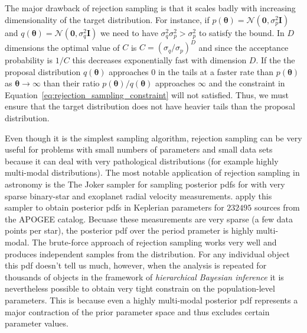 \documentclass[12pt,dvipsnames]{report}
\renewcommand{\vec}[1]{\boldsymbol{\mathbf{#1}}}
\begin{document}
The major drawback of rejection sampling is that it scales badly with
increasing dimensionality of the target distribution. For instance, if
$p(\vec{\theta})=\mathcal{N}(\vec{0}, \sigma_p^2\vec{I})$ and
$q(\vec{\theta})=\mathcal{N}(\vec{0}, \sigma_q^2\vec{I})$ we need to have
$\sigma_q^2\sigma_p^2>\sigma_p^2$ to satisfy the bound. In $D$ dimensions the
optimal value of $C$ is $C=(\sigma_q/\sigma_p)^D$ and since the acceptance
probability is $1/C$ this decreases exponentially fast with dimension $D$. If
the the proposal distribution $q(\vec{\theta})$ approaches $0$ in the tails at
a faster rate than $p(\vec{\theta})$ as $\vec{\theta}\rightarrow \infty$ than
their ratio $p(\vec{\theta})/q(\vec{\theta})$ approaches $\infty$ and the
constraint in Equation~\ref{eq:rejection_sampling_constraint} will not
satisfied. Thus, we must ensure that the target distribution does not have
heavier tails than the proposal distribution.

Even though it is the simplest sampling algorithm, rejection sampling can be
very useful for problems with small numbers of parameters and small data sets
because it can deal with very pathological distributions (for example highly
multi-modal distributions). The most notable application of rejection sampling
in astronomy is the \textsf{The Joker} sampler \citep{2017ApJ...837...20P} for
sampling posterior pdfs for with very sparse binary-star and exoplanet radial
velocity measurements. \citet{2020ApJ...895....2P} apply this sampler to obtain
posterior pdfs in Keplerian parameters for $232 495$ sources from the APOGEE
catalog. Becuase these measurements are very sparse (a few data points per
star), the posterior pdf over the period prameter is highly multi-modal. The
brute-force approach of rejection sampling works very well and produces
independent samples from the distribution. For any individual object this pdf
doesn't tell us much, however, when the analysis is repeated for thousands of
objects in the framework of \textsl{hierarchical Bayesian inference} it is
nevertheless possible to obtain very tight constrain on the population-level
parameters. This is because even a highly multi-modal posterior pdf represents
a major contraction of the prior parameter space and thus excludes certain
parameter values.
\end{document}
